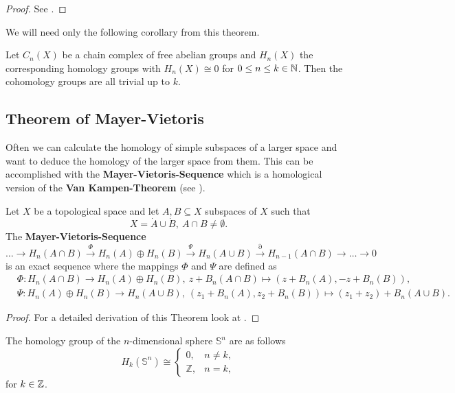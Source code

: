 \begin{proof}
  See \cite[Chapter 3.1]{hatcher}.
\end{proof}

We will need only the following corollary from this theorem.

\begin{col}\label{col:hntriv}
  Let $C_n(X)$ be a chain complex of free abelian groups and $H_n(X)$ the corresponding homology groups with $H_n(X) \cong 0$ for $0 \leq n \leq k \in \mathbb{N}$. Then the cohomology groups are all trivial up to $k$. 
\end{col}

\subsection{Theorem of Mayer-Vietoris}
Often we can calculate the homology of simple subspaces of a larger space and want to deduce the homology of the larger space from them.
This can be accomplished with the \textbf{Mayer-Vietoris-Sequence} which is a homological version of the \textbf{Van Kampen-Theorem} (see \cite[Chapter 1.2]{hatcher}).

\begin{thm}\label{thm:mvs}
  Let $X$ be a topological space and let $A, B \subseteq X$ subspaces of $X$ such that \[X = \dot{A} \cup \dot{B}, \: A \cap B \neq \emptyset.\]
  The \textbf{Mayer-Vietoris-Sequence}
  \begin{equation*}
    \ldots \to H_n(A\cap B) \overset{\Phi}{\to} H_n(A) \oplus H_n(B) \overset{\Psi}{\to} H_n(A \cup B) \overset{\partial}{\to} H_{n-1}(A\cap B) \to \ldots \to 0
  \end{equation*}
  is an exact sequence where the mappings $\Phi$ and $\Psi$ are defined as
  \begin{align*}
    &\Phi\colon H_n(A\cap B) \to H_n(A) \oplus H_n(B),\: z + B_n(A\cap B) \mapsto (z+B_n(A), -z + B_n(B)), \\
    &\Psi\colon H_n(A) \oplus H_n(B) \to H_n(A\cup B), \: (z_1+ B_n(A), z_2 + B_n(B)) \mapsto (z_1 + z_2) + B_n(A \cup B).
  \end{align*}
\end{thm}

\begin{proof}
  For a detailed derivation of this Theorem look at \cite[p. 149]{hatcher}. 
\end{proof}

\begin{ex}
  The homology group of the $n$-dimensional sphere $\mathbb{S}^n$ are as follows
  \begin{equation*}
    H_k(\mathbb{S}^n) \cong \begin{cases}
      0, &n \neq k, \\
      \mathbb{Z}, &n = k,
    \end{cases}
  \end{equation*}
  for $k \in \mathbb{Z}$.
\end{ex}

